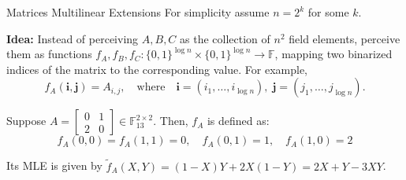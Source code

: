 \documentclass{zkdl-presentation-template}
\begin{document}
    \begin{frame}{Matrices Multilinear Extensions}
        For simplicity assume $n = 2^k$ for some $k$.

        \textbf{Idea:} Instead of perceiving $A,B,C$ as the collection of $n^2$
        field elements, perceive them as functions $f_A,f_B,f_C: \{0,1\}^{\log
        n} \times \{0,1\}^{\log n} \to \mathbb{F}$, mapping two binarized
        indices of the matrix to the corresponding value. For example,
        \begin{equation*}
            f_A(\boldsymbol{i}, \boldsymbol{j}) = A_{i,j}, \quad \text{where} \quad \boldsymbol{i} = (i_1,\dots,i_{\log n}), \; \boldsymbol{j} = (j_1,\dots,j_{\log n}).
        \end{equation*}
        \vspace{-20px}
        \begin{example}
            Suppose $A = \begin{bmatrix} 0 & 1 \\ 2 & 0 \end{bmatrix} \in
            \mathbb{F}_{13}^{2 \times 2}$. Then, $f_A$ is defined as:
            \begin{equation*}
                f_A(0,0) = f_A(1,1) = 0, \quad f_A(0,1) = 1, \quad f_A(1,0) = 2
            \end{equation*}

            Its MLE is given by $\widetilde{f}_A(X, Y) = (1-X)Y + 2X(1-Y) = 2X+Y-3XY$.
        \end{example}
    \end{frame}
\end{document}
